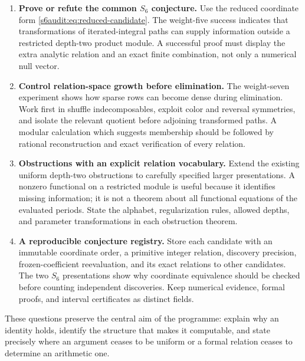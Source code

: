 \documentclass[11pt,a4paper]{article}
\numberwithin{equation}{section}
\theoremstyle{plain}
\theoremstyle{definition}
\theoremstyle{remark}
\begin{document}
\begin{enumerate}[leftmargin=*,label=G\arabic*.]
\item \textbf{Prove or refute the common $S_6$ conjecture.}
Use the reduced coordinate form
\eqref{s6audit:eq:reduced-candidate}. The weight-five success
indicates that transformations of iterated-integral paths can
supply information outside a restricted depth-two product module.
A successful proof must display the extra analytic relation and
an exact finite combination, not only a numerical null vector.

\item \textbf{Control relation-space growth before elimination.}
The weight-seven experiment shows how sparse rows can become
dense during elimination. Work first in shuffle indecomposables,
exploit color and reversal symmetries, and isolate the relevant
quotient before adjoining transformed paths. A modular calculation
which suggests membership should be followed by rational
reconstruction and exact verification of every relation.

\item \textbf{Obstructions with an explicit relation vocabulary.}
Extend the existing uniform depth-two obstructions to carefully
specified larger presentations. A nonzero functional on a
restricted module is useful because it identifies missing
information; it is not a theorem about all functional equations
of the evaluated periods. State the alphabet, regularization
rules, allowed depths, and parameter transformations in each
obstruction theorem.

\item \textbf{A reproducible conjecture registry.} Store each
candidate with an immutable coordinate order, a primitive integer
relation, discovery precision, frozen-coefficient reevaluation,
and its exact relations to other candidates. The two $S_6$
presentations show why coordinate equivalence should be checked
before counting independent discoveries. Keep numerical evidence,
formal proofs, and interval certificates as distinct fields.
\end{enumerate}

These questions preserve the central aim of the programme: explain
why an identity holds, identify the structure that makes it
computable, and state precisely where an argument ceases to be
uniform or a formal relation ceases to determine an arithmetic one.
\end{document}
